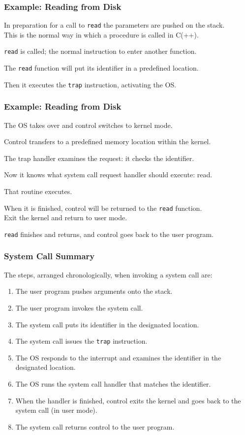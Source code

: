 \begin{frame}
\frametitle{Example: Reading from Disk}

In preparation for a call to \texttt{read} the parameters are pushed on the stack.\\
\quad This is the normal way in which a procedure is called in C(++). 

\texttt{read} is called; the normal instruction to enter another function.

The \texttt{read} function will put its identifier in a predefined location.

Then it executes the \texttt{trap} instruction, activating the OS.

\end{frame}

\begin{frame}
\frametitle{Example: Reading from Disk}


The OS takes over and control switches to kernel mode. 

Control transfers to a predefined memory location within the kernel. 

The trap handler examines the request: it checks the identifier. 

Now it knows what system call request handler should execute: read. 

That routine executes. 

When it is finished, control will be returned to the \texttt{read} function.\\
\quad Exit the kernel and return to user mode.

\texttt{read} finishes and returns, and control goes back to the user program.


\end{frame}

\begin{frame}
\frametitle{System Call Summary}

The steps, arranged chronologically, when invoking a system call are:
\begin{enumerate}
	\item The user program pushes arguments onto the stack.
	\item The user program invokes the system call.
	\item The system call puts its identifier in the designated location.
	\item The system call issues the \texttt{trap} instruction.
	\item The OS responds to the interrupt and examines the identifier in the designated location.
	\item The OS runs the system call handler that matches the identifier.
	\item When the handler is finished, control exits the kernel and goes back to the system call (in user mode).
	\item The system call returns control to the user program.

\end{enumerate}


\end{frame}








